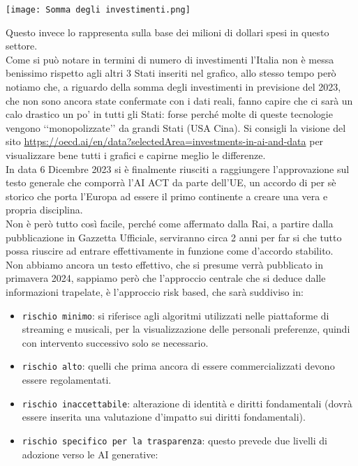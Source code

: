 \documentclass{article}
\begin{document}
\begin{center}
    \texttt{[image: Somma degli investimenti.png]}
\end{center}
\begin{justify}
    Questo invece lo rappresenta sulla base dei milioni di dollari spesi in questo settore.\citep{OECD_AI2}\\
    Come si può notare in termini di numero di investimenti l'Italia non è messa benissimo rispetto agli altri 3 Stati inseriti nel grafico, allo stesso tempo però notiamo che, a riguardo della somma degli investimenti in previsione del 2023, che non sono ancora state confermate con i dati reali, fanno capire che ci sarà un calo drastico un po' in tutti gli Stati: forse perché molte di queste tecnologie vengono ‘‘monopolizzate’’ da grandi Stati (USA Cina).
    Si consigli la visione del sito \url{https://oecd.ai/en/data?selectedArea=investments-in-ai-and-data} per visualizzare bene tutti i grafici e capirne meglio le differenze.\\
    In data 6 Dicembre 2023 si è finalmente riusciti a raggiungere l'approvazione sul testo generale che comporrà l'AI ACT da parte dell'UE, un accordo di per sè storico che porta l'Europa ad essere il primo continente a creare una vera e propria disciplina.\\
    Non è però tutto così facile, perché come affermato dalla Rai, a partire dalla pubblicazione in Gazzetta Ufficiale, serviranno circa 2 anni per far si che tutto possa riuscire ad entrare effettivamente in funzione come d'accordo stabilito.\citep{PA_Digitale_AI}\\
    Non abbiamo ancora un testo effettivo, che si presume verrà pubblicato in primavera 2024, sappiamo però che l'approccio centrale che si deduce dalle informazioni trapelate, è l'approccio risk based, che sarà suddiviso in:
    \begin{itemize}
        \item \texttt{rischio minimo}: si riferisce agli algoritmi utilizzati nelle piattaforme di streaming e musicali, per la visualizzazione delle personali preferenze, quindi con intervento successivo solo se necessario.
        \item \texttt{rischio alto}: quelli che prima ancora di essere commercializzati devono essere regolamentati.
        \item \texttt{rischio inaccettabile}: alterazione di identità e diritti fondamentali (dovrà essere inserita una valutazione d'impatto sui diritti fondamentali).
        \item \texttt{rischio specifico per la trasparenza}: questo prevede due livelli di adozione verso le AI generative:

\end{itemize}
\end{justify}
\end{document}
